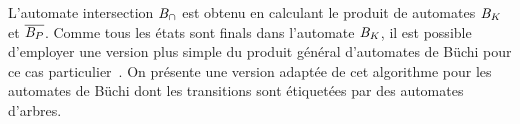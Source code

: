 


L'automate intersection $\mathit B_\cap$ est obtenu en calculant le produit de automates $\mathit B_\mathit K$ et $\overline{\mathit B_P}$.
Comme tous les états sont finals dans l'automate $\mathit B_\mathit K$, il est possible d'employer une version plus
simple du produit général d'automates de Büchi pour ce cas particulier~\cite{MC-Book}. On présente une version
adaptée de cet algorithme pour les automates de Büchi dont les transitions sont étiquetées par des automates d'arbres.

